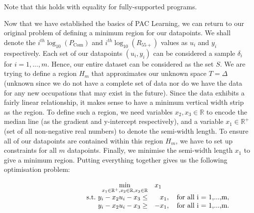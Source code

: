 \documentclass[11pt]{article}
\begin{document}
Note that this holds with equality for fully-supported programs.

Now that we have established the basics of PAC Learning, we can return to our original problem of defining a minimum region for our datapoints. We shall denote the $i^{th} \log_{10}(P_{\text{Com}})$ and $i^{th} \log_{10}(R_{55+})$ values as $u_{i}$ and $y_{i}$ respectively. Each set of our datapoints $(u_{i}, y_{i})$ can be considered a sample $\delta_{i}$ for $i=1,...,m$. Hence, our entire dataset can be considered as the set $S$.  We are trying to define a region $H_{m}$ that approximates our unknown space $T=\Delta$ (unknown since we do not have a complete set of data nor do we have the data for any new occupations that may exist in the future). Since the data exhibits a fairly linear relationship, it makes sense to have a minimum vertical width strip as the region. To define such a region, we need variables $x_{2}, x_{3} \in \mathbb{R}$ to encode the median line (as the gradient and y-intercept respectively), and a variable $x_{1} \in \mathbb{R}^{+}$ (set of all non-negative real numbers) to denote the semi-width length. To ensure all of our datapoints are contained within this region $H_{m}$, we have to set up constraints for all $m$ datapoints. Finally, we minimise the semi-width length $x_{1}$ to give a minimum region. Putting everything together gives us the following optimisation problem:

\begin{align}
	\label{eq:5}
	\begin{array}{rrclcl}
	\displaystyle \min_{x_{1} \in \mathbb{R}^{+},x_{2} \in \mathbb{R},x_{3} \in \mathbb{R}}&  \multicolumn{3}{l}{x_{1}}&\\
	\text{s.t.}\  y_{i} - x_{2}u_{i} - x_{3} \leq& x_{1}, \quad \text{for all i = 1,...,m},&\\
	y_{i} - x_{2}u_{i} - x_{3} \geq& -x_{1}, \quad \text{for all i = 1,...,m}.&\\
	\end{array}
\end{align}


\end{document}
